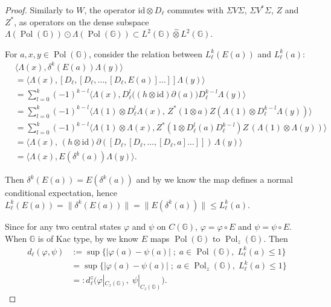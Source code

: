 \documentclass[12pt, reqno]{amsart}
\theoremstyle{definition}
\theoremstyle{remark}
\numberwithin{equation}{section}
\begin{document}
\begin{proof}
 Similarly to $W$, the operator $\mathrm{id} \otimes D_\ell$ commutes with 
 $\Sigma V \Sigma$, $\Sigma V^* \Sigma$, $Z$ and $Z^*$, as operators on the 
 dense subspace 
 $\Lambda(\operatorname{Pol}(\mathbb{G}))\odot\Lambda(\operatorname{Pol}(\mathbb{G}))
 \subset L^2(\mathbb{G})\hat{\otimes}L^2(\mathbb{G})$.

 For $a,x,y \in \operatorname{Pol}(\mathbb{G})$, consider the relation between 
 $L_\ell^k(E(a))$ and $L_\ell^k(a)$:
\begin{align*}
    &\langle \Lambda(x),\delta^k(E(a))\Lambda(y)\rangle\\
    &=\langle \Lambda(x),[D_\ell,[D_\ell,\dots,[D_\ell,E(a)]\dots]]\Lambda(y)\rangle \\
    &= \sum_{l=0}^{k}(-1)^{k-l}
       \langle\Lambda(x),D_\ell^l\bigl((h\otimes \mathrm{id})\partial(a)\bigr)
       D_\ell^{k-l}\Lambda(y)\rangle\\
    &=\sum_{l=0}^{k}(-1)^{k-l}
       \langle \Lambda(1)\otimes D_\ell^l\Lambda(x),\,Z^*(1\otimes a) Z(\Lambda(1)\otimes D_\ell^{k-l}\Lambda(y))\rangle\\
    &=\sum_{l=0}^{k}(-1)^{k-l}
       \langle \Lambda(1)\otimes\Lambda(x),Z^*
       (1\otimes D_\ell^l(a)D_\ell^{k-l})Z\,(\Lambda(1)\otimes \Lambda(y))\rangle\\
    &=\langle \Lambda(x),\,(h\otimes \mathrm{id})\partial(
       [D_\ell,[D_\ell,\dots,[D_\ell,a]\dots]])\,\Lambda(y)\rangle\\
    &=\langle \Lambda(x),E(\delta^k(a))\Lambda(y)\rangle .
\end{align*}

 Then $\delta^k(E(a)) = E(\delta^k(a))$ and by \cite[Proposition~4.2]{16} we 
 know the map defines a normal conditional expectation, hence 
 $L_\ell^k(E(a)) = \|\delta^k(E(a))\| = \|E(\delta^k(a))\| \le L_\ell^k(a)$.

 Since for any two central states $\varphi$ and $\psi$ on $C(\mathbb{G})$, 
 $\varphi = \varphi \circ E$ and $\psi = \psi \circ E$. When $\mathbb{G}$ is 
 of Kac type, by \cite[Proposition~4.2]{16} we know $E$ maps 
 $\operatorname{Pol}(\mathbb{G})$ to $\operatorname{Pol}_z(\mathbb{G})$. Then
\begin{align*}
    d_\ell(\varphi, \psi) &:= \sup \bigl\{ |\varphi(a) - \psi(a)| \; ; \; 
        a \in \operatorname{Pol}(\mathbb{G}), \; L_\ell^k(a) \leq 1 \bigr\} \\
    &= \sup \bigl\{ |\varphi(a) - \psi(a)| \; ; \; 
        a \in \operatorname{Pol}_z(\mathbb{G}), \; L_\ell^k(a) \leq 1 \bigr\} \\
    &=: d_\ell^z \bigl( \varphi|_{C_z(\mathbb{G})}, \; \psi|_{C_z(\mathbb{G})} \bigr).
\end{align*}


\end{proof}
\end{document}

